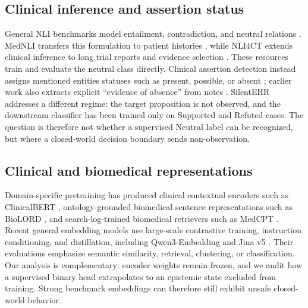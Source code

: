 \documentclass[11pt]{article}
\begin{document}
\subsection{Clinical inference and assertion status}
General NLI benchmarks model entailment, contradiction, and neutral relations
\citep{bowman-etal-2015-large,williams-etal-2018-broad}. MedNLI transfers this
formulation to patient histories \citep{romanov-shivade-2018-lessons}, while
NLI4CT extends clinical inference to long trial reports and evidence selection
\citep{jullien-etal-2023-nli4ct}. These resources train and evaluate the neutral
class directly. Clinical assertion detection instead assigns mentioned entities
statuses such as present, possible, or absent
\citep{van-aken-etal-2021-assertion}; earlier work also extracts explicit
``evidence of absence'' from notes \citep{carter-etal-2016-evidence}. SilentEHR
addresses a different regime: the target proposition is not observed, and the
downstream classifier has been trained only on Supported and Refuted cases. The
question is therefore not whether a supervised Neutral label can be recognized,
but where a closed-world decision boundary sends non-observation.

\subsection{Clinical and biomedical representations}
Domain-specific pretraining has produced clinical contextual encoders such as
ClinicalBERT \citep{alsentzer-etal-2019-clinicalbert}, ontology-grounded
biomedical sentence representations such as BioLORD
\citep{remy-etal-2022-biolord}, and search-log-trained biomedical retrievers such
as MedCPT \citep{jin-etal-2023-medcpt}. Recent general embedding models use
large-scale contrastive training, instruction conditioning, and distillation,
including Qwen3-Embedding \citep{zhang-etal-2025-qwen3embedding} and Jina v5
\citep{akram-etal-2026-jinav5}. Their evaluations emphasize semantic
similarity, retrieval, clustering, or classification. Our analysis is
complementary: encoder weights remain frozen, and we audit how a supervised
binary head extrapolates to an epistemic state excluded from training. Strong
benchmark embeddings can therefore still exhibit unsafe closed-world behavior.
\end{document}

